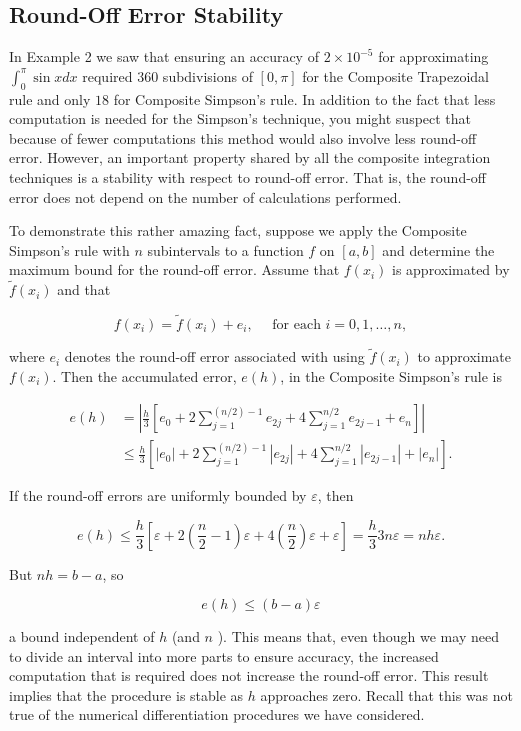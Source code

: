 \subsection*{Round-Off Error Stability}
In Example 2 we saw that ensuring an accuracy of $2 \times 10^{-5}$ for approximating $\int_{0}^{\pi} \sin x d x$ required $360$ subdivisions of $[0, \pi]$ for the Composite Trapezoidal rule and only $18$ for Composite Simpson's rule. In addition to the fact that less computation is needed for the Simpson's technique, you might suspect that because of fewer computations this method would also involve less round-off error. However, an important property shared by all the composite integration techniques is a stability with respect to round-off error. That is, the round-off error does not depend on the number of calculations performed.

To demonstrate this rather amazing fact, suppose we apply the Composite Simpson's rule with $n$ subintervals to a function $f$ on $[a, b]$ and determine the maximum bound for the round-off error. Assume that $f\left(x_{i}\right)$ is approximated by $\tilde{f}\left(x_{i}\right)$ and that

$$
f\left(x_{i}\right)=\tilde{f}\left(x_{i}\right)+e_{i}, \quad \text { for each } i=0,1, \ldots, n,
$$

where $e_{i}$ denotes the round-off error associated with using $\tilde{f}\left(x_{i}\right)$ to approximate $f\left(x_{i}\right)$. Then the accumulated error, $e(h)$, in the Composite Simpson's rule is

$$
\begin{aligned}
e(h) & =\left|\frac{h}{3}\left[e_{0}+2 \sum_{j=1}^{(n / 2)-1} e_{2 j}+4 \sum_{j=1}^{n / 2} e_{2 j-1}+e_{n}\right]\right| \\
& \leq \frac{h}{3}\left[\left|e_{0}\right|+2 \sum_{j=1}^{(n / 2)-1}\left|e_{2 j}\right|+4 \sum_{j=1}^{n / 2}\left|e_{2 j-1}\right|+\left|e_{n}\right|\right] .
\end{aligned}
$$

If the round-off errors are uniformly bounded by $\varepsilon$, then

$$
e(h) \leq \frac{h}{3}\left[\varepsilon+2\left(\frac{n}{2}-1\right) \varepsilon+4\left(\frac{n}{2}\right) \varepsilon+\varepsilon\right]=\frac{h}{3} 3 n \varepsilon=n h \varepsilon .
$$

But $n h=b-a$, so

$$
e(h) \leq(b-a) \varepsilon
$$

a bound independent of $h$ (and $n$ ). This means that, even though we may need to divide an interval into more parts to ensure accuracy, the increased computation that is required does not increase the round-off error. This result implies that the procedure is stable as $h$ approaches zero. Recall that this was not true of the numerical differentiation procedures we have considered.

